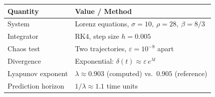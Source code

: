 \documentclass[11pt]{article}
\begin{document}
\begin{center}
\begin{tabular}{ll}
\textbf{Quantity} & \textbf{Value / Method} \\
\hline
System & Lorenz equations, $\sigma=10,\ \rho=28,\ \beta=8/3$ \\
Integrator & RK4, step size $h=0.005$ \\
Chaos test & Two trajectories, $\varepsilon = 10^{-8}$ apart \\
Divergence & Exponential: $\delta(t) \approx \varepsilon\, e^{\lambda t}$ \\
Lyapunov exponent & $\lambda \approx 0.903$ (computed) vs.\ $0.905$ (reference) \\
Prediction horizon & $1/\lambda \approx 1.1$ time units \\
\end{tabular}
\end{center}
\end{document}
